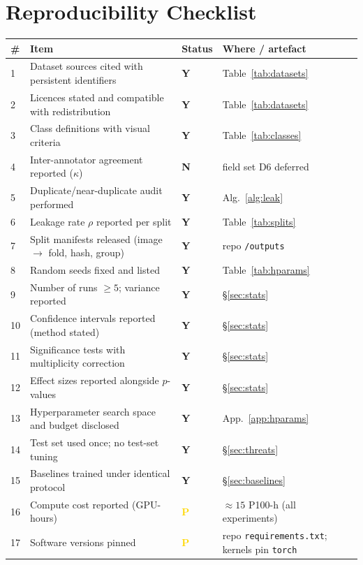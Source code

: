 \documentclass[10pt,twocolumn,a4paper]{article}
\newcommand{\cmark}{\textcolor{leafgreen}{\textbf{Y}}}
\newcommand{\xmark}{\textcolor{tbdred}{\textbf{N}}}
\newcommand{\pmark}{\textcolor{gold}{\textbf{P}}}
\begin{document}
\section{Reproducibility Checklist}
\label{app:repro}
\vspace{-2pt}
{\footnotesize
\begin{tabularx}{\textwidth}{@{}p{0.6cm} X p{1.4cm} p{3.2cm}@{}}
\toprule
\rowcolor{hdrgray}
\# & Item & Status & Where / artefact \\
\midrule
1 & Dataset sources cited with persistent identifiers & \cmark & Table~\ref{tab:datasets} \\
2 & Licences stated and compatible with redistribution & \cmark & Table~\ref{tab:datasets} \\
3 & Class definitions with visual criteria & \cmark & Table~\ref{tab:classes} \\
4 & Inter-annotator agreement reported ($\kappa$) & \xmark & field set D6 deferred \\
5 & Duplicate/near-duplicate audit performed & \cmark & Alg.~\ref{alg:leak} \\
6 & Leakage rate $\rho$ reported per split & \cmark & Table~\ref{tab:splits} \\
7 & Split manifests released (image $\rightarrow$ fold, hash, group) & \cmark & repo \texttt{/outputs} \\
8 & Random seeds fixed and listed & \cmark & Table~\ref{tab:hparams} \\
9 & Number of runs $\geq 5$; variance reported & \cmark & \S\ref{sec:stats} \\
10 & Confidence intervals reported (method stated) & \cmark & \S\ref{sec:stats} \\
11 & Significance tests with multiplicity correction & \cmark & \S\ref{sec:stats} \\
12 & Effect sizes reported alongside $p$-values & \cmark & \S\ref{sec:stats} \\
13 & Hyperparameter search space and budget disclosed & \cmark & App.~\ref{app:hparams} \\
14 & Test set used once; no test-set tuning & \cmark & \S\ref{sec:threats} \\
15 & Baselines trained under identical protocol & \cmark & \S\ref{sec:baselines} \\
16 & Compute cost reported (GPU-hours) & \pmark & $\approx15$ P100-h (all experiments) \\
17 & Software versions pinned & \pmark & repo \texttt{requirements.txt}; kernels pin \texttt{torch} \\

\end{tabularx}}
\end{document}
